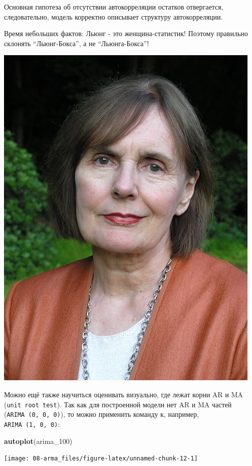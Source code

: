 \documentclass[]{book}
\newenvironment{Shaded}{\begin{snugshade}}{\end{snugshade}}
\newcommand{\DecValTok}[1]{\textcolor[rgb]{0.00,0.00,0.81}{#1}}
\newcommand{\KeywordTok}[1]{\textcolor[rgb]{0.13,0.29,0.53}{\textbf{#1}}}
\newcommand{\NormalTok}[1]{#1}
\begin{document}
Основная гипотеза об отсутствии автокорреляции остатков отвергается, следовательно, модель корректно описывает структуру автокорреляции.

Время небольших фактов: Льюнг - это женщина-статистик! Поэтому правильно склонять ``Льюнг-Бокса'', а не ``Льюнга-Бокса''!

\includegraphics{images/Greta.jpg}

Можно ещё также научиться оценивать визуально, где лежат корни AR и MA (\texttt{unit\ root\ test}). Так как для построенной модели нет AR и MA частей (\texttt{ARIMA\ (0,\ 0,\ 0)}), то можно применить команду к, например, \texttt{ARIMA\ (1,\ 0,\ 0)}:

\begin{Shaded}
\begin{Highlighting}[]
\KeywordTok{autoplot}\NormalTok{(arima_}\DecValTok{100}\NormalTok{)}
\end{Highlighting}
\end{Shaded}

\begin{center}\texttt{[image: 08-arma\_files/figure-latex/unnamed-chunk-12-1]} \end{center}
\end{document}
